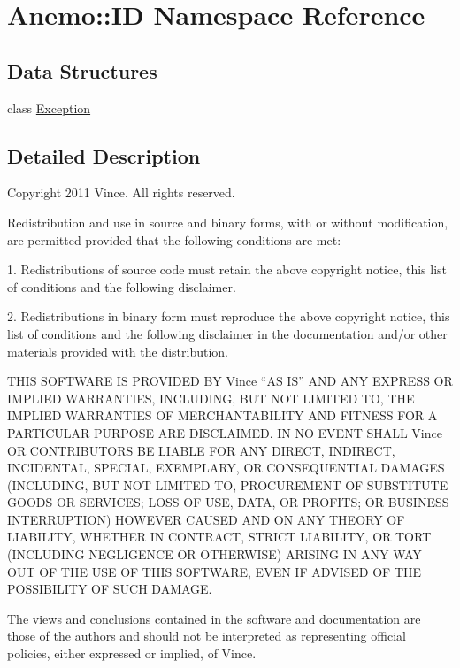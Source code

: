 \hypertarget{namespace_anemo_1_1_i_d}{
\section{Anemo::ID Namespace Reference}
\label{namespace_anemo_1_1_i_d}
}
\subsection*{Data Structures}
\begin{DoxyCompactItemize}
\item 
class \hyperlink{class_anemo_1_1_i_d_1_1_exception}{Exception}
\end{DoxyCompactItemize}


\subsection{Detailed Description}
Copyright 2011 Vince. All rights reserved.

Redistribution and use in source and binary forms, with or without modification, are permitted provided that the following conditions are met:

1. Redistributions of source code must retain the above copyright notice, this list of conditions and the following disclaimer.

2. Redistributions in binary form must reproduce the above copyright notice, this list of conditions and the following disclaimer in the documentation and/or other materials provided with the distribution.

THIS SOFTWARE IS PROVIDED BY Vince ``AS IS'' AND ANY EXPRESS OR IMPLIED WARRANTIES, INCLUDING, BUT NOT LIMITED TO, THE IMPLIED WARRANTIES OF MERCHANTABILITY AND FITNESS FOR A PARTICULAR PURPOSE ARE DISCLAIMED. IN NO EVENT SHALL Vince OR CONTRIBUTORS BE LIABLE FOR ANY DIRECT, INDIRECT, INCIDENTAL, SPECIAL, EXEMPLARY, OR CONSEQUENTIAL DAMAGES (INCLUDING, BUT NOT LIMITED TO, PROCUREMENT OF SUBSTITUTE GOODS OR SERVICES; LOSS OF USE, DATA, OR PROFITS; OR BUSINESS INTERRUPTION) HOWEVER CAUSED AND ON ANY THEORY OF LIABILITY, WHETHER IN CONTRACT, STRICT LIABILITY, OR TORT (INCLUDING NEGLIGENCE OR OTHERWISE) ARISING IN ANY WAY OUT OF THE USE OF THIS SOFTWARE, EVEN IF ADVISED OF THE POSSIBILITY OF SUCH DAMAGE.

The views and conclusions contained in the software and documentation are those of the authors and should not be interpreted as representing official policies, either expressed or implied, of Vince. 
